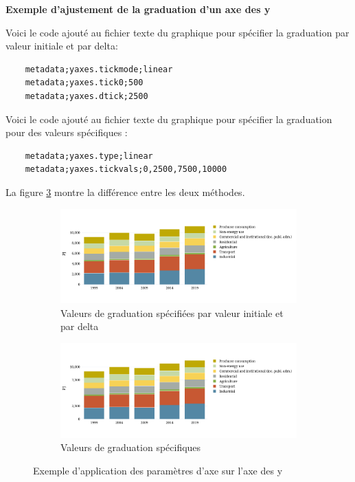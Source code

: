 \documentclass[11pt]{article}
\begin{document}
\pagebreak
\textbf{Exemple d'ajustement de la graduation d'un axe des y}

Voici le code ajouté au fichier texte du graphique pour spécifier la graduation par valeur initiale et par delta:

\begin{lstlisting}
    metadata;yaxes.tickmode;linear
    metadata;yaxes.tick0;500
    metadata;yaxes.dtick;2500
\end{lstlisting}

Voici le code ajouté au fichier texte du graphique pour spécifier la graduation pour des valeurs spécifiques :

\begin{lstlisting}
    metadata;yaxes.type;linear
    metadata;yaxes.tickvals;0,2500,7500,10000
\end{lstlisting}

La figure \ref{fig:exempleGraduation} montre la différence entre les deux méthodes.

\begin{figure}[h]
    \centering
    \begin{subfigure}{\textwidth}
      \centering
      \includegraphics[width=\linewidth]{assets/fig3.2_linear_tickmode.png}
      \caption{Valeurs de graduation spécifiées par valeur initiale et par delta}
      \label{fig:grad1}
    \end{subfigure}%
    
    \begin{subfigure}{\textwidth}
      \centering
      \includegraphics[width=\linewidth]{assets/fig3.2_linear_tickvals.png}
      \caption{Valeurs de graduation spécifiques}
      \label{fig:grad2}
    \end{subfigure}
    \caption{Exemple d'application des paramètres d'axe sur l'axe des y}
    \label{fig:exempleGraduation}
    \end{figure}
\end{document}
